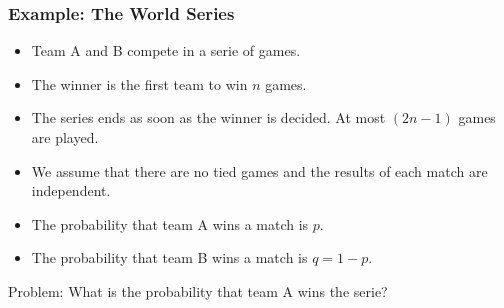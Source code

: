 \documentclass{beamer}
\begin{document}
\begin{frame}%
\frametitle{Example: The World Series}


\begin{itemize}

\item Team A and B compete in a serie of games.

\item<2-> The winner is the first team to win $n$ games.

\item<3-> The series ends as soon as the winner is decided. At most $(2n - 1)$ games are played.

\item<4-> We assume that there are no tied games and the results of each match are independent.

\item<5-> The probability that team A wins a match is $p$.

\item<6-> The probability that team B wins a match is $q = 1 - p$.

\end{itemize}


\begin{mdframed}[style=exampledefault]
Problem: What is the probability that team A wins the serie?
\end{mdframed}


\end{frame}
\end{document}
